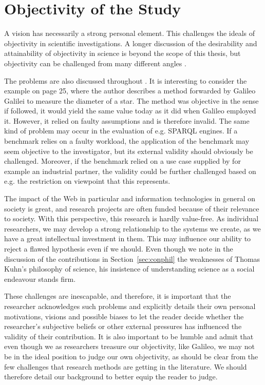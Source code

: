 \section{Objectivity of the Study}\label{sec:objectivity}

A vision has necessarily a strong personal element. This challenges
the ideals of objectivity in scientific investigations. A longer
discussion of the desirability and attainability of objectivity in
science is beyond the scope of this thesis, but objectivity can be
challenged from many different angles
\cite{sep-scientific-objectivity}.

The problems are also discussed throughout
\cite{chalmers1999whatis}. It is interesting to consider the example
on page 25, where the author describes a method forwarded by Galileo
Galilei to measure the diameter of a star. The method was objective in
the sense if followed, it would yield the same value today as it did
when Galileo employed it. However, it relied on faulty assumptions and
is therefore invalid. The same kind of problem may occur in the
evaluation of e.g. SPARQL engines. If a benchmark relies on a faulty
workload, the application of the benchmark may seem objective to the
investigator, but its external validity should obviously be
challenged. Moreover, if the benchmark relied on a use case supplied
by for example an industrial partner, the validity could be further
challenged based on e.g. the restriction on viewpoint that this
represents. 

The impact of the Web in particular and information technologies in
general on society is great, and research projects are often funded
because of their relevance to society. With this perspective, this
research is hardly value-free. As individual researchers, we may
develop a strong relationship to the systems we create, as we have a
great intellectual investment in them. This may influence our ability
to reject a flawed hypothesis even if we should. Even though we note
in the discussion of the contributions in Section~\ref{sec:conphil}
the weaknesses of Thomas Kuhn's philosophy of science, his insistence
of understanding science as a social endeavour stands firm.

These challenges are inescapable, and therefore, it is important that
the researcher acknowledges such problems and explicitly details their
own personal motivations, visions and possible biases to let the
reader decide whether the researcher's subjective beliefs or other
external pressures has influenced the validity of their
contribution. It is also important to be humble and admit that even
though we as researchers treasure our objectivity, like Galileo, we
may not be in the ideal position to judge our own objectivity, as
should be clear from the few challenges that research methods are
getting in the literature. We should therefore detail our background
to better equip the reader to judge.

